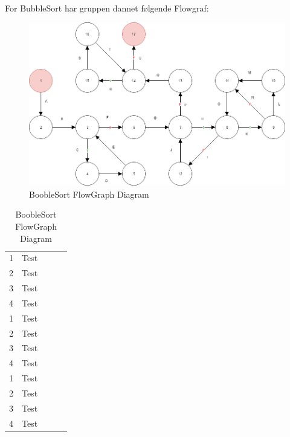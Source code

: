 \documentclass[11pt]{article}
\begin{document}
    
    \\
    \noindent
    For BubbleSort har gruppen dannet følgende Flowgraf:\\
    \begin{table}[H]
        \begin{minipage}{.7\textwidth}
            \begin{figure}[H]
            \centering
            \includegraphics[width=1\textwidth,angle=0]{Struktureret_System_Udvikling/Workshop_3/Booble_Sort_Flowgraph.png}
            \caption{BoobleSort FlowGraph Diagram}
            \label{fig:BoobleSortGraph}
            \end{figure}
        \end{minipage}
        \begin{minipage}{.3\textwidth}
            \begin{tabular}{lllll}
            1 & Test\\
            2 & Test\\
            3 & Test\\
            4 & Test\\
            1 & Test\\
            2 & Test\\
            3 & Test\\
            4 & Test\\
            1 & Test\\
            2 & Test\\
            3 & Test\\
            4 & Test\\
            \end{tabular}
        \end{minipage}
    \end{table}
\end{document}
